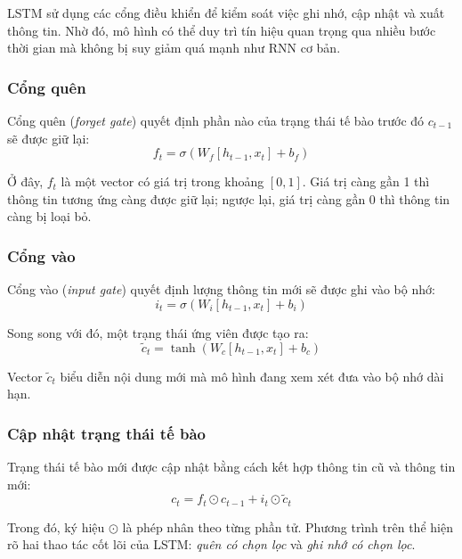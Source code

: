 \documentclass[a4paper,12pt,twoside]{report}
\begin{document}
LSTM sử dụng các cổng điều khiển để kiểm soát việc ghi nhớ, cập nhật và xuất thông tin. Nhờ đó, mô hình có thể duy trì tín hiệu quan trọng qua nhiều bước thời gian mà không bị suy giảm quá mạnh như RNN cơ bản.

\subsubsection{Cổng quên}

Cổng quên (\textit{forget gate}) quyết định phần nào của trạng thái tế bào trước đó $c_{t-1}$ sẽ được giữ lại:
\begin{equation}
f_t = \sigma(W_f[h_{t-1}, x_t] + b_f)
\end{equation}

Ở đây, $f_t$ là một vector có giá trị trong khoảng $[0,1]$. Giá trị càng gần 1 thì thông tin tương ứng càng được giữ lại; ngược lại, giá trị càng gần 0 thì thông tin càng bị loại bỏ.

\subsubsection{Cổng vào}

Cổng vào (\textit{input gate}) quyết định lượng thông tin mới sẽ được ghi vào bộ nhớ:
\begin{equation}
i_t = \sigma(W_i[h_{t-1}, x_t] + b_i)
\end{equation}

Song song với đó, một trạng thái ứng viên được tạo ra:
\begin{equation}
\tilde{c}_t = \tanh(W_c[h_{t-1}, x_t] + b_c)
\end{equation}

Vector $\tilde{c}_t$ biểu diễn nội dung mới mà mô hình đang xem xét đưa vào bộ nhớ dài hạn.

\subsubsection{Cập nhật trạng thái tế bào}

Trạng thái tế bào mới được cập nhật bằng cách kết hợp thông tin cũ và thông tin mới:
\begin{equation}
c_t = f_t \odot c_{t-1} + i_t \odot \tilde{c}_t
\end{equation}

Trong đó, ký hiệu $\odot$ là phép nhân theo từng phần tử. Phương trình trên thể hiện rõ hai thao tác cốt lõi của LSTM: \textit{quên có chọn lọc} và \textit{ghi nhớ có chọn lọc}.
\end{document}
